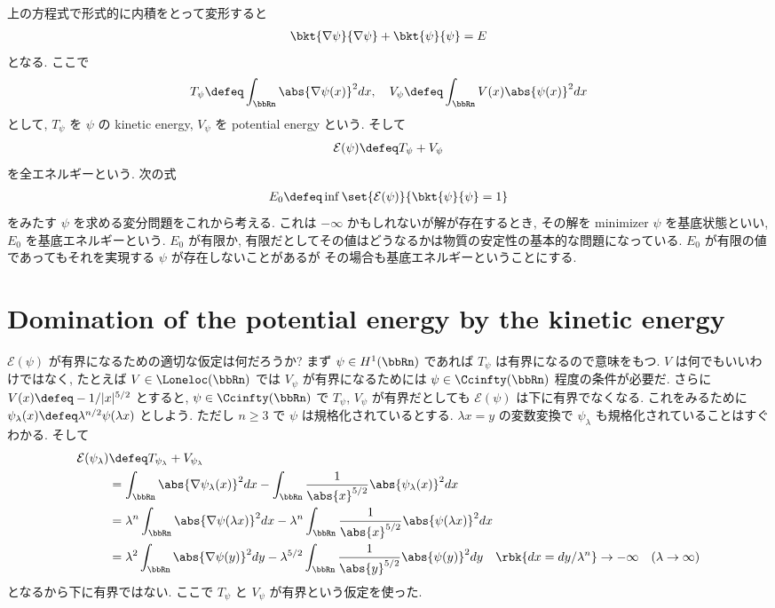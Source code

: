 \documentclass[openany, a4paper, oneside]{jsbook}
\begin{document}
上の方程式で形式的に内積をとって変形すると
\begin{align}
 \bkt{\nabla \psi}{\nabla \psi} + \bkt{\psi}{\psi}
 =
 E
\end{align}
となる.
ここで
\begin{align}
 T_{\psi}
 \defeq
 \int_{\bbRn} \abs{\nabla \psi (x)}^2 dx, \quad
 V_{\psi}
 \defeq
 \int_{\bbRn} V(x) \abs{\psi (x)}^2 dx
\end{align}
として, $T_{\psi}$ を $\psi$ の kinetic energy,
$V_{\psi}$ を potential energy という.
そして
\begin{align}
 \mathcal{E}(\psi) \defeq T_{\psi} + V_{\psi}
\end{align}
を全エネルギーという.
次の式
\begin{align}
 E_0
 \defeq
 \inf \set{\mathcal{E}(\psi)}{\bkt{\psi}{\psi} = 1}
\end{align}
をみたす $\psi$ を求める変分問題をこれから考える.
これは $- \infty$ かもしれないが解が存在するとき, その解を minimizer
$\psi$ を基底状態といい,
$E_0$ を基底エネルギーという.
$E_0$ が有限か, 有限だとしてその値はどうなるかは物質の安定性の基本的な問題になっている.
$E_0$ が有限の値であってもそれを実現する $\psi$ が存在しないことがあるが
その場合も基底エネルギーということにする.
\section{Domination of the potential energy by the kinetic energy}

$\mathcal{E}(\psi)$ が有界になるための適切な仮定は何だろうか?
まず $\psi \in H^1(\bbRn)$ であれば $T_{\psi}$ は有界になるので意味をもつ.
$V$ は何でもいいわけではなく,
たとえば $V \in \Loneloc (\bbRn)$ では
$V_{\psi}$ が有界になるためには $\psi \in \Ccinfty (\bbRn)$ 程度の条件が必要だ.
さらに  $V(x) \defeq - 1/{|x|^{5/2}}$ とすると,
$\psi \in \Ccinfty (\bbRn)$ で $T_{\psi}$, $V_{\psi}$ が有界だとしても
$\mathcal{E}(\psi)$ は下に有界でなくなる.
これをみるために $\psi_{\lambda} (x) \defeq \lambda^{n/2} \psi(\lambda x)$ としよう.
ただし $n \geq 3$ で $\psi$ は規格化されているとする.
$\lambda x = y$ の変数変換で $\psi_{\lambda}$ も規格化されていることはすぐわかる.
そして
\begin{align}
 \mathcal{E} (\psi_{\lambda})
 &\defeq
 T_{\psi_{\lambda}} + V_{\psi_{\lambda}} \\
 &=
 \int_{\bbRn} \abs{\nabla \psi_{\lambda} (x)}^2 dx
 -\int_{\bbRn} \frac{1}{\abs{x}^{5/2}} \abs{\psi_{\lambda} (x)}^2 dx \\
 &=
 \lambda^n \int_{\bbRn} \abs{\nabla \psi (\lambda x)}^2 dx
 -\lambda^n \int_{\bbRn} \frac{1}{\abs{x}^{5/2}} \abs{\psi (\lambda x)}^2 dx \\
 &=
 \lambda^2 \int_{\bbRn} \abs{\nabla \psi (y)}^2 dy
  -\lambda^{5/2} \int_{\bbRn} \frac{1}{\abs{y}^{5/2}} \abs{\psi (y)}^2 dy
 \quad \rbk{dx = dy / \lambda^n}
 \to - \infty \quad (\lambda \to \infty)
\end{align}
となるから下に有界ではない.
ここで $T_{\psi}$ と $V_{\psi}$ が有界という仮定を使った.
\end{document}
